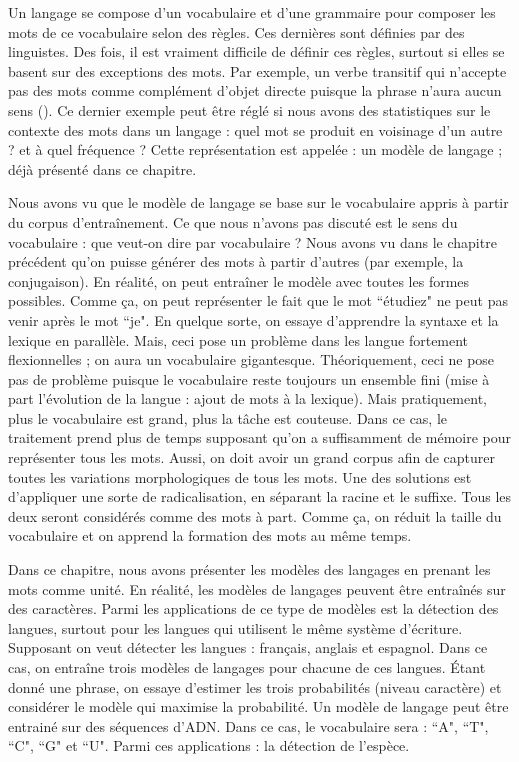 \documentclass{KodeBook}
\begin{document}
\begin{discussion}

Un langage se compose d'un vocabulaire et d'une grammaire pour composer les mots de ce vocabulaire selon des règles. 
Ces dernières sont définies par des linguistes. 
Des fois, il est vraiment difficile de définir ces règles, surtout si elles se basent sur des exceptions des mots. 
Par exemple, un verbe transitif qui n'accepte pas des mots comme complément d'objet directe puisque la phrase n'aura aucun sens (). 
Ce dernier exemple peut être réglé si nous avons des statistiques sur le contexte des mots dans un langage : quel mot se produit en voisinage d'un autre ? et à quel fréquence ?
Cette représentation est appelée : un modèle de langage ; déjà présenté dans ce chapitre. 

Nous avons vu que le modèle de langage se base sur le vocabulaire appris à partir du corpus d'entraînement. 
Ce que nous n'avons pas discuté est le sens du vocabulaire : que veut-on dire par vocabulaire ?
Nous avons vu dans le chapitre précédent qu'on puisse générer des mots à partir d'autres (par exemple, la conjugaison).
En réalité, on peut entraîner le modèle avec toutes les formes possibles. 
Comme ça, on peut représenter le fait que le mot ``étudiez" ne peut pas venir après le mot ``je".
En quelque sorte, on essaye d'apprendre la syntaxe et la lexique en parallèle. 
Mais, ceci pose un problème dans les langue fortement flexionnelles ; on aura un vocabulaire gigantesque.
Théoriquement, ceci ne pose pas de problème puisque le vocabulaire reste toujours un ensemble fini (mise à part l'évolution de la langue : ajout de mots à la lexique). 
Mais pratiquement, plus le vocabulaire est grand, plus la tâche est couteuse. 
Dans ce cas, le traitement prend plus de temps supposant qu'on a suffisamment de mémoire pour représenter tous les mots. 
Aussi, on doit avoir un grand corpus afin de capturer toutes les variations morphologiques de tous les mots. 
Une des solutions est d'appliquer une sorte de radicalisation, en séparant la racine et le suffixe. 
Tous les deux seront considérés comme des mots à part. 
Comme ça, on réduit la taille  du vocabulaire et on apprend la formation des mots au même temps. 

Dans ce chapitre, nous avons présenter les modèles des langages en prenant les mots comme unité. 
En réalité, les modèles de langages peuvent être entraînés sur des caractères. 
Parmi les applications de ce type de modèles est la détection des langues, surtout pour les langues qui utilisent le même système d'écriture. 
Supposant on veut détecter les langues : français, anglais et espagnol. 
Dans ce cas, on entraîne trois modèles de langages pour chacune de ces langues. 
Étant donné une phrase, on essaye d'estimer les trois probabilités (niveau caractère) et considérer le modèle qui maximise la probabilité. 
Un modèle de langage peut être entrainé sur des séquences d'ADN. 
Dans ce cas, le vocabulaire sera : ``A", ``T", ``C", ``G" et ``U". 
Parmi ces applications : la détection de l'espèce. 
\end{discussion}

\ifx\wholebook\relax\else
% 
% 
	
\end{document}
